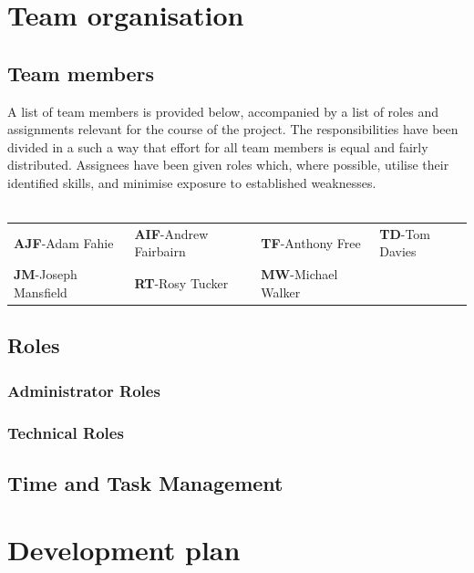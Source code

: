 \documentclass[10pt,a4paper]{article}
\begin{document}
\section{Team organisation}

\subsection{Team members}
A list of team members is provided below, accompanied by a list of roles and
assignments relevant for the course of the project. The responsibilities have
been divided in a such a way that effort for all team members is equal and
fairly distributed. Assignees have been given roles which, where possible,
utilise their identified skills, and minimise exposure to established
weaknesses. \\
\\
\begin{tabular}{  p{4cm}  p{4cm}  p{4cm} p{4cm}  }
\textbf{AJF}-Adam Fahie            &         \textbf{AIF}-Andrew Fairbairn    &     \textbf{TF}-Anthony Free          &        \textbf{TD}-Tom Davies \\
\textbf{JM}-Joseph Mansfield     &        \textbf{RT}-Rosy Tucker           &          \textbf{MW}-Michael Walker \\
\end{tabular}

\subsection{Roles}
\subsubsection{Administrator Roles} 


\subsubsection{Technical Roles}


\subsection{Time and Task Management}

\section{Development plan}
\end{document}
